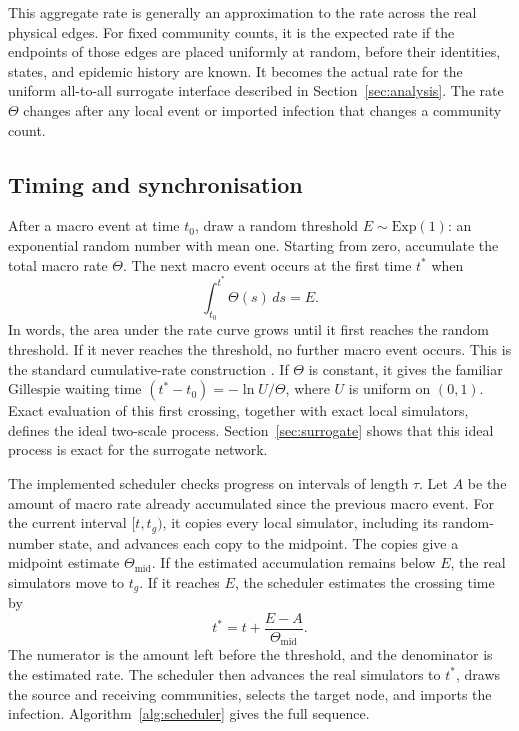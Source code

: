 \documentclass[a4paper,fleqn]{cas-sc}
\newcommand{\Exp}{\mathrm{Exp}}
\begin{document}
This aggregate rate is generally an approximation to the rate across the real physical edges. For fixed community counts, it is the expected rate if the endpoints of those edges are placed uniformly at random, before their identities, states, and epidemic history are known. It becomes the actual rate for the uniform all-to-all surrogate interface described in Section~\ref{sec:analysis}. The rate $\Theta$ changes after any local event or imported infection that changes a community count.

\subsection{Timing and synchronisation}
\label{sec:timing}

After a macro event at time $t_0$, draw a random threshold $E\sim\Exp(1)$: an exponential random number with mean one. Starting from zero, accumulate the total macro rate $\Theta$. The next macro event occurs at the first time $t^\ast$ when
\begin{equation}
\label{eq:hazard_integral}
\int_{t_0}^{t^\ast}\Theta(s)\,ds=E.
\end{equation}
In words, the area under the rate curve grows until it first reaches the random threshold. If it never reaches the threshold, no further macro event occurs. This is the standard cumulative-rate construction \citep{ethier1986,anderson2007}. If $\Theta$ is constant, it gives the familiar Gillespie waiting time $(t^\ast-t_0)=-\ln U/\Theta$, where $U$ is uniform on $(0,1)$. Exact evaluation of this first crossing, together with exact local simulators, defines the ideal two-scale process. Section~\ref{sec:surrogate} shows that this ideal process is exact for the surrogate network.

The implemented scheduler checks progress on intervals of length $\tau$. Let $A$ be the amount of macro rate already accumulated since the previous macro event. For the current interval $[t,t_g)$, it copies every local simulator, including its random-number state, and advances each copy to the midpoint. The copies give a midpoint estimate $\Theta_{\mathrm{mid}}$. If the estimated accumulation remains below $E$, the real simulators move to $t_g$. If it reaches $E$, the scheduler estimates the crossing time by
\begin{equation}
\label{eq:interpolation}
t^\ast=t+\frac{E-A}{\Theta_{\mathrm{mid}}}.
\end{equation}
The numerator is the amount left before the threshold, and the denominator is the estimated rate. The scheduler then advances the real simulators to $t^\ast$, draws the source and receiving communities, selects the target node, and imports the infection. Algorithm~\ref{alg:scheduler} gives the full sequence.
\end{document}
